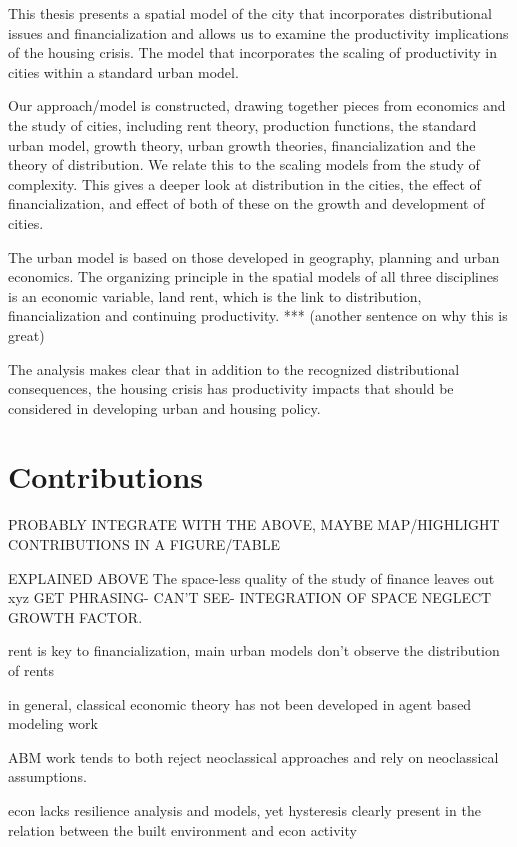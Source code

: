 This thesis presents a spatial model of the city that incorporates distributional issues and financialization and allows us to examine the productivity implications of the housing crisis. The model that incorporates the scaling of productivity in cities within a standard urban model. 

Our approach/model is constructed, drawing together pieces from %
economics and the study of cities, including rent theory, production functions, the standard urban model, growth theory, urban growth theories, financialization and the theory of distribution.
We relate this to the scaling models from the study of complexity. This gives a deeper look at distribution in the cities, the effect of financialization, and effect of both of these on the growth and development of cities. 

The urban model is based on those developed in geography, planning and urban economics. The organizing principle in  the spatial models of all three disciplines is an economic variable, land rent, which is the link to distribution, financialization and continuing productivity. *** (another sentence on why this is great)

The analysis makes clear that in addition to the recognized distributional consequences, the housing crisis has productivity impacts that should be considered in developing urban and housing policy. 


\section{Contributions}

PROBABLY INTEGRATE WITH THE ABOVE, MAYBE MAP/HIGHLIGHT CONTRIBUTIONS IN A FIGURE/TABLE

EXPLAINED ABOVE The space-less quality of the study of finance leaves out xyz GET PHRASING- CAN'T SEE- INTEGRATION OF SPACE NEGLECT GROWTH FACTOR. 

rent is key to financialization, main urban models don't observe the distribution of rents

in general, classical economic theory has not been developed in agent based modeling work

ABM work tends to both reject neoclassical approaches and rely on neoclassical assumptions.

econ lacks resilience analysis and models, yet hysteresis clearly present in the relation between the built environment and econ activity

